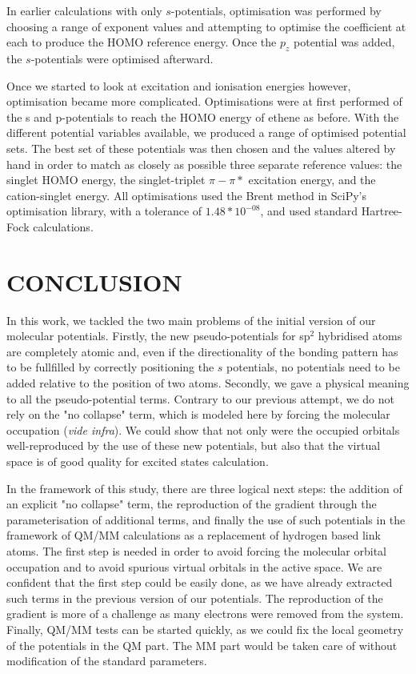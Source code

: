\documentclass[12pt]{article}
\begin{document}
In earlier calculations with only \(s\)-potentials, optimisation was performed by choosing a range of exponent values and attempting to optimise the coefficient at each to produce the HOMO reference energy. Once the \(p_{z}\) potential was added, the \(s\)-potentials were optimised afterward. 

Once we started to look at excitation and ionisation energies however, optimisation became more complicated. Optimisations were at first performed of the s and p-potentials to reach the HOMO energy of ethene as before. With the different potential variables available, we produced a range of optimised potential sets. The best set of these potentials was then chosen and the values altered by hand in order to match as closely as possible three separate reference values: the singlet HOMO energy, the singlet-triplet \(\pi-\pi*\) excitation energy, and the cation-singlet energy. All optimisations used the Brent method in SciPy's optimisation library, with a tolerance of \(1.48*10^{-08}\), and used standard Hartree-Fock calculations.\cite{scipy}

\section*{\sffamily \Large CONCLUSION}
In this work, we tackled the two main problems of the initial version of our
molecular potentials.
Firstly, the new pseudo-potentials for sp$^2$ hybridised
atoms are completely atomic and, even if the directionality of the bonding pattern
has to be fullfilled by correctly positioning the \(s\) potentials, no potentials need to
be added relative to the position of two atoms.
Secondly, we gave a physical meaning to all the pseudo-potential
terms.
Contrary to our previous attempt, we do not rely on the "no collapse" term,
which is modeled here by forcing the molecular occupation (\emph{vide infra}).
We could show that not only were the occupied orbitals well-reproduced
by the use of these new potentials, but also that the virtual space is of good quality
for excited states calculation.

In the framework of this study, there are three logical next steps: the addition of an explicit
"no collapse" term, the reproduction of the gradient through the parameterisation
of additional terms, and finally the use of such potentials in the framework
of QM/MM calculations as a replacement of hydrogen based link atoms.
The first step is needed in order to avoid forcing the molecular orbital occupation and
to avoid spurious virtual orbitals in the active space.
We are confident that the first step could be easily done, as we have already extracted such
terms in the previous version of our potentials.
The reproduction of the gradient is more of a challenge as many electrons were removed from the system.
Finally, QM/MM tests can be started quickly, as we could fix the local geometry of the potentials
in the QM part. The MM part would be taken care of without modification of the standard parameters.
\end{document}
